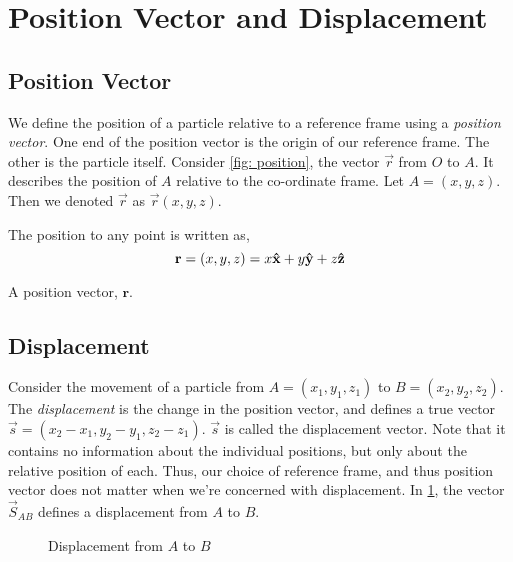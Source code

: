 \section{Position Vector and Displacement}

\subsection{Position Vector}

We define the position of a particle relative to a reference frame using a \emph{position 
vector}. One end of the position vector is the origin of our reference frame. The other is 
the particle itself. Consider \cref{fig: position}, the 
vector \(\vec{r}\) from \(O\) to \(A\). It describes the position of \(A\) relative to the
co-ordinate frame. Let \(A = (x,y,z)\). Then we denoted \(\vec{r}\) as \(\vec{r}(x,y,z)\).

The position to any point is written as, \[
    \boldsymbol{\mathbf{r}} = (x,y,z) = x\boldsymbol{\mathbf{\hat{x}}} + y\boldsymbol{\mathbf{\hat{y}}} + z\boldsymbol{\mathbf{\hat{z}}}
\]

\begin{marginfigure}
    \centering
    \caption{A position vector, \(\mathbf{r}\).}
    \label{fig: position}
\end{marginfigure}

\subsection{Displacement}


Consider the movement of a particle from \(A = (x_1,y_1,z_1)\) to \(B = (x_2,y_2,z_2)\). 
The \emph{displacement} is the change in the position vector,
and defines a true vector \(\vec{s} = (x_2-x_1,y_2-y_1,z_2-z_1)\).
\(\vec{s}\) is called the displacement vector. 
Note that it contains no information about the
individual positions, but only about the relative position of each. Thus, our choice
of reference frame, and thus position vector does not matter when we're concerned with displacement. 
In \cref{fig: displacement}, the vector
\(\vec{S}_{AB}\) defines a displacement from \(A\) to \(B\).

\begin{figure}
    [H]
    \centering
    \caption{Displacement from \(A\) to \(B\)}
    \label{fig: displacement}
\end{figure}

